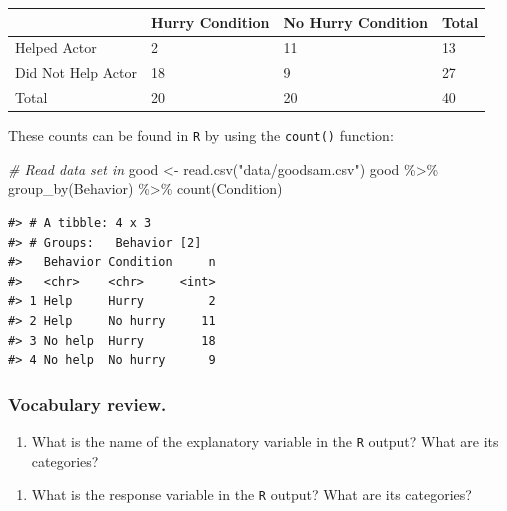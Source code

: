 \documentclass[
]{report}
\newenvironment{Shaded}{\begin{snugshade}}{\end{snugshade}}
\newcommand{\CommentTok}[1]{\textcolor[rgb]{0.56,0.35,0.01}{\textit{#1}}}
\newcommand{\FunctionTok}[1]{\textcolor[rgb]{0.00,0.00,0.00}{#1}}
\newcommand{\NormalTok}[1]{#1}
\newcommand{\OtherTok}[1]{\textcolor[rgb]{0.56,0.35,0.01}{#1}}
\newcommand{\SpecialCharTok}[1]{\textcolor[rgb]{0.00,0.00,0.00}{#1}}
\newcommand{\StringTok}[1]{\textcolor[rgb]{0.31,0.60,0.02}{#1}}
\providecommand{\tightlist}{%
  \setlength{\itemsep}{0pt}\setlength{\parskip}{0pt}}
\begin{document}
\begin{longtable}[]{@{}llll@{}}
\toprule
& Hurry Condition & No Hurry Condition & Total \\
\midrule
\endhead
Helped Actor & 2 & 11 & 13 \\
Did Not Help Actor & 18 & 9 & 27 \\
Total & 20 & 20 & 40 \\
\bottomrule
\end{longtable}

\newpage

These counts can be found in \texttt{R} by using the \texttt{count()} function:

\begin{Shaded}
\begin{Highlighting}[]
\CommentTok{\# Read data set in}
\NormalTok{good }\OtherTok{\textless{}{-}} \FunctionTok{read.csv}\NormalTok{(}\StringTok{"data/goodsam.csv"}\NormalTok{) }
\NormalTok{good }\SpecialCharTok{\%\textgreater{}\%} \FunctionTok{group\_by}\NormalTok{(Behavior) }\SpecialCharTok{\%\textgreater{}\%} \FunctionTok{count}\NormalTok{(Condition)}
\end{Highlighting}
\end{Shaded}

\begin{verbatim}
#> # A tibble: 4 x 3
#> # Groups:   Behavior [2]
#>   Behavior Condition     n
#>   <chr>    <chr>     <int>
#> 1 Help     Hurry         2
#> 2 Help     No hurry     11
#> 3 No help  Hurry        18
#> 4 No help  No hurry      9
\end{verbatim}

\hypertarget{vocabulary-review.-2}{%
\subsubsection*{Vocabulary review.}\label{vocabulary-review.-2}}

\begin{enumerate}
\def\labelenumi{\arabic{enumi}.}
\tightlist
\item
  What is the name of the explanatory variable in the \texttt{R} output? What are its categories?
\end{enumerate}

\vspace{0.2in}

\begin{enumerate}
\def\labelenumi{\arabic{enumi}.}
\setcounter{enumi}{1}
\tightlist
\item
  What is the response variable in the \texttt{R} output? What are its categories?
\end{enumerate}
\end{document}
